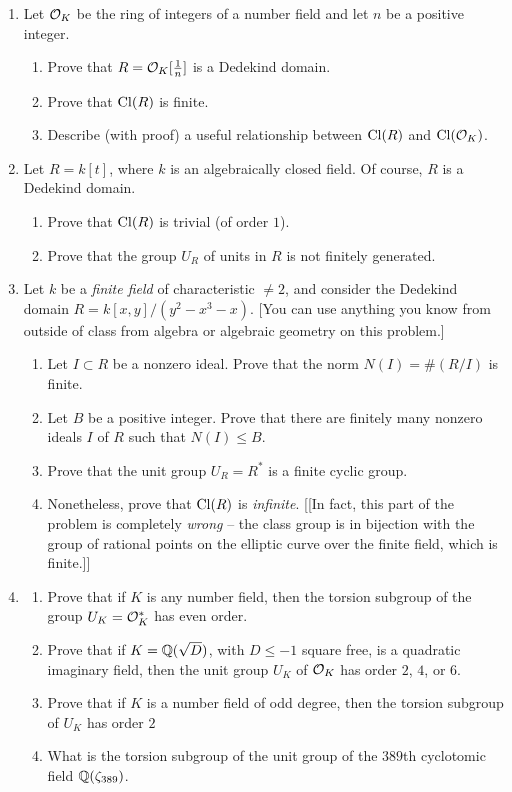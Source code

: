 \documentclass{article}
\begin{document}
\begin{enumerate}

\item Let $\mathcal{O}_K$ be the ring of integers of a number field and let
  $n$ be a positive integer.  
  \begin{enumerate}
    \item Prove that $R=\mathcal{O}_K[\frac{1}{n}]$ is a Dedekind domain.  
    \item Prove that $\operatorname{Cl}(R)$ is finite.
    \item Describe (with proof) a useful relationship between $\operatorname{Cl}(R)$ and $\operatorname{Cl}(\mathcal{O}_K)$.
  \end{enumerate}

\item Let $R=k[t]$, where $k$ is an algebraically closed field.  Of course,
$R$ is a Dedekind domain.
  \begin{enumerate}
  \item Prove that $\operatorname{Cl}(R)$ is trivial (of order $1$).
  \item Prove that the group $U_R$ of units in $R$ is not finitely generated.
  \end{enumerate}

\item  Let $k$ be a {\em finite field} of characteristic $\neq 2$, and consider
the Dedekind domain $R=k[x,y]/(y^2-x^3-x)$.  [You can use anything you know
from outside of class from algebra or algebraic geometry on this problem.]
\begin{enumerate}
\item Let $I\subset R$ be a nonzero ideal.  Prove that the norm $N(I) = \#(R/I)$
is finite.
\item Let $B$ be a positive integer.  Prove that there are finitely
many nonzero ideals $I$ of $R$ such that $N(I)\leq B$.
\item Prove that the unit group $U_R = R^*$ is a finite cyclic group.
\item Nonetheless, prove that $\operatorname{Cl}(R)$ is {\em infinite}. [[In fact, this part of the problem is completely {\em wrong} -- the class group is in bijection with the group of rational points on the elliptic curve over the finite field, which is finite.]]
\end{enumerate}

\item \label{last}\begin{enumerate}
\item Prove that if $K$ is any number field, then the torsion subgroup of the group
$U_K=\mathcal{O}_K^*$ has even order.
\item Prove that if $K=\mathbb{Q}(\sqrt{D})$, with $D\leq -1$ square free, is
  a quadratic imaginary field, then the unit group $U_K$ of $\mathcal{O}_K$ has
  order $2$, $4$, or $6$.
\item Prove that if $K$ is a number field of odd degree, then the
  torsion subgroup of $U_K$ has order $2$
\item What is the torsion subgroup of the unit group of the $389$th
  cyclotomic field $\mathbb{Q}(\zeta_{389})$.
\end{enumerate}

\end{enumerate}
\end{document}
